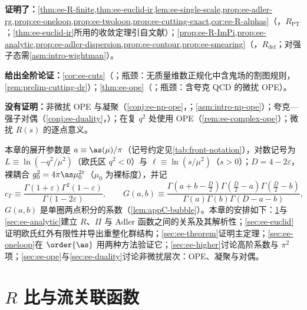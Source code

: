 \begin{tcolorbox}[enhanced,breakable,title=本章证明了什么／没有证明什么,fonttitle=\bfseries,
  colback=gray!3!white,colframe=gray!55!black,boxrule=0.6pt,arc=2pt,
  left=5pt,right=5pt,top=3pt,bottom=3pt,before skip=6pt,after skip=6pt]
\textbf{证明了：}\cref{thm:ee-R-finite,thm:ee-euclid-ir,lem:ee-single-scale,prop:ee-adler-rg,prop:ee-oneloop,prop:ee-twoloop,prop:ee-cutting-exact,cor:ee-R-alphas}（\tagR，$R_{\mathrm{PT}}$；\cref{thm:ee-euclid-ir}所用的收敛定理引自文献）；\cref{prop:ee-R-ImPi,prop:ee-analytic,prop:ee-adler-dispersion,prop:ee-contour,prop:ee-smearing}（\tagR，$R_{\mathrm{def}}$；对强子态需\cref{asm:intro-wightman}）。\par
\textbf{给出全阶论证：}\cref{cor:ee-cuts}（\tagA；瓶颈：无质量维数正规化中含鬼场的割图规则，\cref{rem:prelim-cutting-dr}）；\cref{thm:ee-ope}（\tagA；瓶颈：含夸克 QCD 的微扰 OPE）。\par
\textbf{没有证明：}非微扰 OPE 与凝聚（\cref{conj:ee-np-ope}，\tagC；\cref{asm:intro-np-ope}）；夸克—强子对偶（\cref{conj:ee-duality}，\tagC）；在复 $q^2$ 处使用 OPE（\cref{rem:ee-complex-ope}）；微扰 $R(s)$ 的逐点意义。
\end{tcolorbox}

本章的展开参数是 $a\equiv\as(\mu)/\pi$（记号约定见\cref{tab:front-notation}），对数记号为 $L\equiv\ln(-q^2/\mu^2)$（欧氏区 $q^2<0$）与 $\ell\equiv\ln(s/\mu^2)$（$s>0$）；$D=4-2\varepsilon$，裸耦合 $g_0^2=4\pi\as\mu_0^{2\varepsilon}$（$\mu_0$ 为裸标度），并记
\begin{equation}\label{eq:ee-cGamma}
c_\Gamma\equiv\frac{\Gamma(1+\varepsilon)\Gamma^2(1-\varepsilon)}{\Gamma(1-2\varepsilon)},\qquad
G(a,b)\equiv\frac{\Gamma(a+b-\frac D2)\Gamma(\frac D2-a)\Gamma(\frac D2-b)}{\Gamma(a)\Gamma(b)\Gamma(D-a-b)} ,
\end{equation}
$G(a,b)$ 是单圈两点积分的系数（\cref{lem:appC-bubble}）。本章的安排如下：\cref{sec:ee-R}与\cref{sec:ee-analytic}建立 $R$、$\Pi$ 与 Adler 函数之间的关系及其解析性；\cref{sec:ee-euclid}证明欧氏红外有限性并导出重整化群结构；\cref{sec:ee-theorem}证明主定理；\cref{sec:ee-oneloop}在 $\order{\as}$ 用两种方法验证它；\cref{sec:ee-higher}讨论高阶系数与 $\pi^2$ 项；\cref{sec:ee-ope}与\cref{sec:ee-duality}讨论非微扰层次：OPE、凝聚与对偶。

\section{$R$ 比与流关联函数}\label{sec:ee-R}


